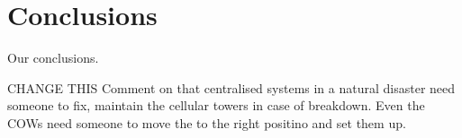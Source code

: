 \section{Conclusions}
Our conclusions.

CHANGE THIS Comment on that centralised systems in a natural disaster need someone to fix, maintain the cellular towers in case of breakdown. Even the COWs need someone to move the to the right positino and set them up.
